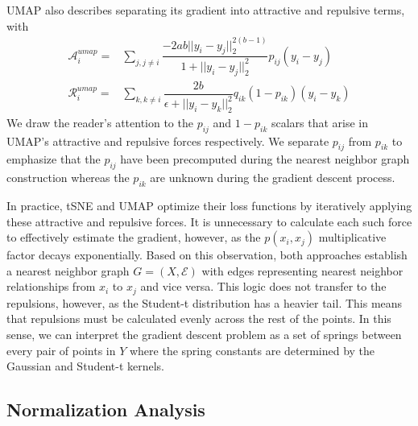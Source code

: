 \documentclass[sigconf, nonacm]{acmart}
\begin{document}
UMAP also describes separating its gradient into attractive and repulsive terms, with
\begin{align}
    \mathcal{A}_i^{umap} = & \sum_{j, j \neq i} \dfrac{-2ab||y_i - y_j||_2^{2(b-1)}}{1 + ||y_i - y_j||_2^2} p_{ij} (y_i - y_j) \label{umap_attr} \\
    \mathcal{R}_i^{umap} = & \sum_{k, k \neq i} \dfrac{2b}{\epsilon + ||y_i - y_k||_2^2} q_{ik} (1 - p_{ik}) (y_i - y_k) \label{umap_rep}
\end{align}
We draw the reader's attention to the $p_{ij}$ and $1 - p_{ik}$ scalars that arise in UMAP's attractive and repulsive forces respectively. We separate
$p_{ij}$ from $p_{ik}$ to emphasize that the $p_{ij}$ have been precomputed during the nearest neighbor graph construction whereas the $p_{ik}$ are
unknown during the gradient descent process.

In practice, tSNE and UMAP optimize their loss functions by iteratively applying these attractive and repulsive forces.
It is unnecessary to calculate each such force to effectively estimate the gradient, however,
as the $p(x_i, x_j)$ multiplicative factor decays exponentially.
Based on this observation, both approaches establish a nearest neighbor graph \cite{van2014accelerating} $G = (X, \mathcal{E})$ with edges representing nearest
neighbor relationships from $x_i$ to $x_j$ and vice versa. 
This logic does not transfer to the repulsions, however, as the Student-t distribution has a heavier tail. This means that repulsions must be calculated evenly
across the rest of the points. In this sense, we can interpret the gradient descent problem as a set of springs between every pair of points in $Y$ where the
spring constants are determined by the Gaussian and Student-t kernels.

\subsection{Normalization Analysis}
\end{document}
